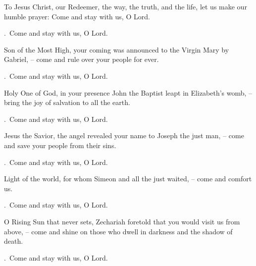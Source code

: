 \lettrine[loversize=0.15,lines=2]{T}{}o Jesus Christ, our Redeemer, the way, the truth, and the life, let us make our humble prayer: Come and stay with us, O Lord.
\par \Rbar.~Come and stay with us, O Lord.

Son of the Most High, your coming was announced to the Virgin Mary by Gabriel,
– come and rule over your people for ever.
\par \Rbar.~Come and stay with us, O Lord.

Holy One of God, in your presence John the Baptist leapt in Elizabeth’s womb,
– bring the joy of salvation to all the earth.
\par \Rbar.~Come and stay with us, O Lord.

Jesus the Savior, the angel revealed your name to Joseph the just man,
– come and save your people from their sins.
\par \Rbar.~Come and stay with us, O Lord.

Light of the world, for whom Simeon and all the just waited,
– come and comfort us.
\par \Rbar.~Come and stay with us, O Lord.

O Rising Sun that never sets, Zechariah foretold that you would visit us from above,
– come and shine on those who dwell in darkness and the shadow of death.
\par \Rbar.~Come and stay with us, O Lord.
